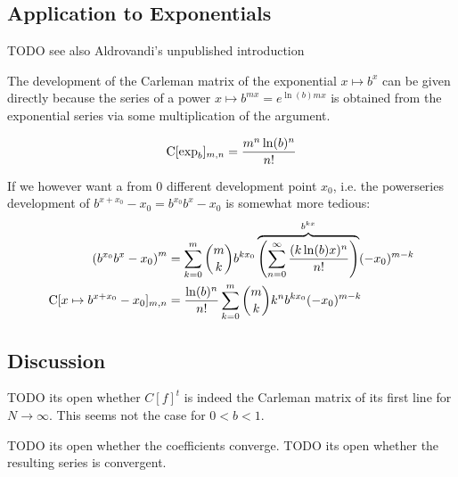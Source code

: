 \documentclass{article}
\numberwithin{equation}{section}
\begin{document}
\subsection{Application to Exponentials}
TODO see also Aldrovandi's unpublished introduction

The development of the Carleman matrix of the exponential $x\mapsto
b^x$ can be given directly because the series of a power $x\mapsto b^{mx} =
e^{\ln(b) m x}$ is obtained from the exponential series via some
multiplication of the argument.

\begin{align}
  \operatorname{C}[\exp_b]_{m,n} = \frac{m^n\ln(b)^n}{ n!}
\end{align}

If we however want a from 0 different development point $x_0$,
i.e. the powerseries development of $b^{x+x_0}-x_0=b^{x_0}b^x-x_0$ is
somewhat more tedious:
\begin{align}
  \left(b^{x_0}b^x-x_0\right)^m &= \sum_{k=0}^m \binom{m}{k} b^{k x_0}
  \overbrace{\left(\sum_{n=0}^\infty \frac{(k\ln(b)x)^n}{n!}
    \right)}^{b^{kx}} (-x_0)^{m-k}\\
  \operatorname{C}[x\mapsto b^{x+x_0}-x_0]_{m,n} &=
  \frac{\ln(b)^n}{n!}\sum_{k=0}^m \binom{m}{k} k^n b^{k x_0} (-x_0)^{m-k}
\end{align}

\subsection{Discussion}
TODO its open whether $C[f]^t$ is indeed the Carleman matrix of
its first line for $N\to\infty$. This seems not the case for $0<b<1$.

TODO its open whether the coefficients converge.
TODO its open whether the resulting series is convergent.
\end{document}
